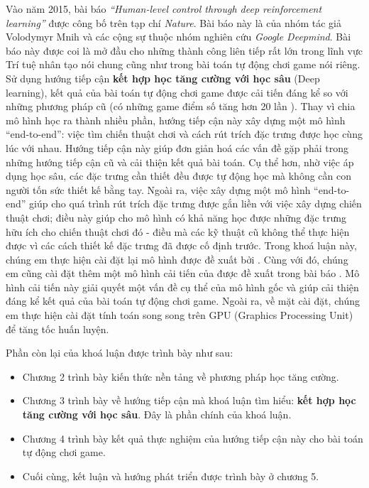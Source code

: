 Vào năm 2015, bài báo \textit{``Human-level control through deep reinforcement learning''} \cite{mnihdqn2015} được công bố trên tạp chí \textit{Nature}.
Bài báo này là của nhóm tác giả Volodymyr Mnih và các cộng sự thuộc nhóm nghiên cứu \textit{Google Deepmind}.
Bài báo này được coi là mở đầu cho những thành công liên tiếp rất lớn trong lĩnh vực Trí tuệ nhân tạo nói chung cũng như trong bài toán tự động chơi game nói riêng.
Sử dụng hướng tiếp cận \textbf{kết hợp học tăng cường với học sâu} (Deep learning), kết quả của bài toán tự động chơi game được cải tiến đáng kể so với những phương pháp cũ (có những game điểm số tăng hơn 20 lần \cite{mnihdqn2015}).
Thay vì chia mô hình học ra thành nhiều phần, hướng tiếp cận này xây dựng một mô hình ``end-to-end'': việc tìm chiến thuật chơi và cách rút trích đặc trưng được học cùng lúc với nhau.
Hướng tiếp cận này giúp đơn giản hoá các vấn đề gặp phải trong những hướng tiếp cận cũ và cải thiện kết quả bài toán.
Cụ thể hơn, nhờ việc áp dụng học sâu, các đặc trưng cần thiết đều được tự động học mà không cần con người tốn sức thiết kế bằng tay.
Ngoài ra, việc xây dựng một mô hình ``end-to-end'' giúp cho quá trình rút trích đặc trưng được gắn liền với việc xây dựng chiến thuật chơi; điều này giúp cho mô hình có khả năng học được những đặc trưng hữu ích cho chiến thuật chơi đó - điều mà các kỹ thuật cũ không thể thực hiện được vì các cách thiết kế đặc trưng đã được cố định trước.
Trong khoá luận này, chúng em thực hiện cài đặt lại mô hình được đề xuất bởi \cite{mnihdqn2015}.
Cùng với đó, chúng em cũng cài đặt thêm một mô hình cải tiến của \cite{mnihdqn2015} được đề xuất trong bài báo \cite{van2015deep}.
Mô hình cải tiến này giải quyết một vấn đề cụ thể của mô hình gốc và giúp cải thiện đáng kể kết quả của bài toán tự động chơi game.
Ngoài ra, về mặt cài đặt, chúng em thực hiện cài đặt tính toán song song trên GPU (Graphics Processing Unit) để tăng tốc huấn luyện.

\medskip
Phần còn lại của khoá luận được trình bày như sau:
\begin{itemize}
	\item Chương 2 trình bày kiến thức nền tảng về phương pháp học tăng cường.
	\item Chương 3 trình bày về hướng tiếp cận mà khoá luận tìm hiểu: \textbf{kết hợp học tăng cường với học sâu}.
	Đây là phần chính của khoá luận.
	\item Chương 4 trình bày kết quả thực nghiệm của hướng tiếp cận này cho bài toán tự động chơi game.
	\item Cuối cùng, kết luận và hướng phát triển được trình bày ở chương 5.
\end{itemize}